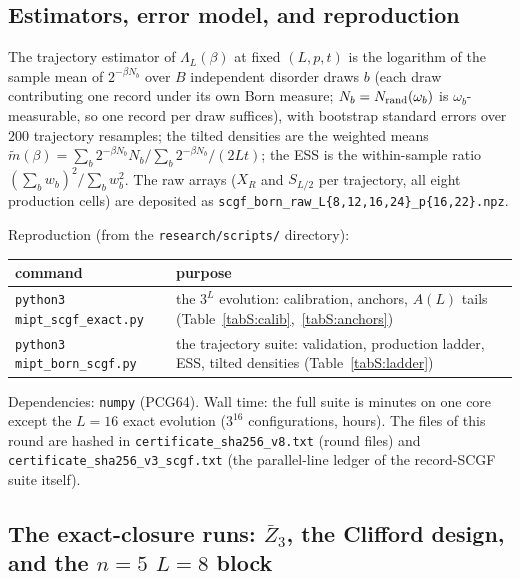 \documentclass[aps,prx,reprint,superscriptaddress,nobibnotes,longbibliography]{revtex4-2}
\begin{document}
\subsection{Estimators, error model, and reproduction}

The trajectory estimator of $\Lambda_L(\beta)$ at fixed $(L,p,t)$ is the
logarithm of the sample mean of $2^{-\beta N_b}$ over $B$ independent
disorder draws $b$ (each draw contributing one record under its own Born
measure; $N_b=N_{\rm rand}(\omega_b)$ is $\omega_b$-measurable, so one
record per draw suffices), with bootstrap standard errors over $200$
trajectory resamples; the tilted densities are the weighted means
$\tilde m(\beta)=\sum_b2^{-\beta N_b}N_b/\sum_b2^{-\beta N_b}/(2Lt)$; the
ESS is the within-sample ratio
$(\sum_bw_b)^2/\sum_bw_b^2$.  The raw arrays ($X_R$ and $S_{L/2}$ per
trajectory, all eight production cells) are deposited as
\texttt{scgf\_born\_raw\_L\{8,12,16,24\}\_p\{16,22\}.npz}.

Reproduction (from the \texttt{research/scripts/} directory):
\begin{center}
\begin{tabular}{ll}
command & purpose\\
\hline
\texttt{python3 mipt\_scgf\_exact.py} & the $3^L$ evolution: calibration,
anchors, $A(L)$ tails (Table~\ref{tabS:calib},~\ref{tabS:anchors})\\
\texttt{python3 mipt\_born\_scgf.py} & the trajectory suite: validation,
production ladder, ESS, tilted densities
(Table~\ref{tabS:ladder})\\
\end{tabular}
\end{center}
Dependencies: \texttt{numpy} (PCG64).  Wall time: the full suite is
minutes on one core except the $L=16$ exact evolution ($3^{16}$
configurations, hours).  The files of this round are hashed in
\texttt{certificate\_sha256\_v8.txt} (round files) and
\texttt{certificate\_sha256\_v3\_scgf.txt} (the parallel-line ledger of
the record-SCGF suite itself).


\subsection{The exact-closure runs: $\bar Z_3$, the Clifford design, and the $n=5$ $L=8$ block}
\label{sm:v22closure}
\end{document}
